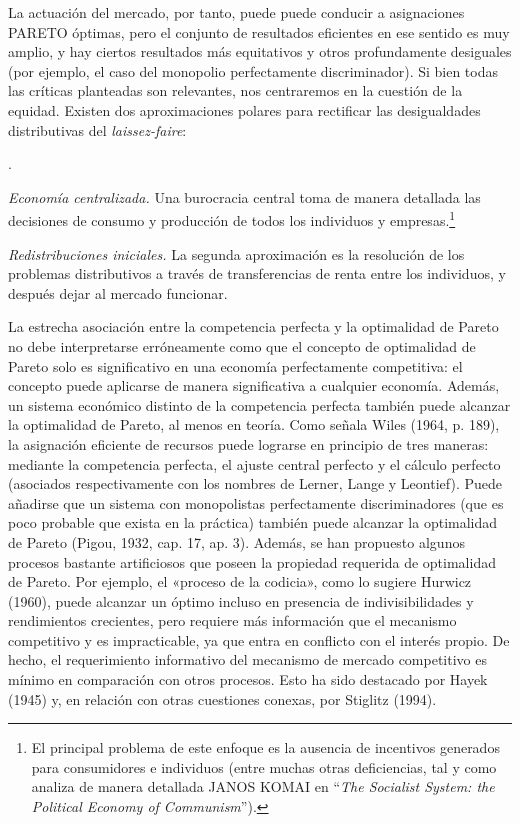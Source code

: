 \documentclass[10pt,a4paper]{article}
\newcounter{numitem}
\newenvironment{lnum}
      {\begin{list}{\arabic{numitem}.}{%
          \usecounter{numitem}%
          \setlength{\leftmargin}{1cm}%
          \setlength{\parskip}{3pt}%
          \setlength{\itemsep}{0pt}%
          \setlength{\parsep}{0pt}%
      }}
      {\end{list}}
\newcommand{\authorfont}[1]{{\fontfamily{EBGaramond-TLF}\selectfont #1}}
\begin{document}
La actuación del mercado, por tanto, puede puede conducir a asignaciones PARETO óptimas, pero el conjunto de resultados eficientes en ese sentido es muy amplio, y hay ciertos resultados más equitativos y otros profundamente desiguales (por ejemplo, el caso del monopolio perfectamente discriminador). Si bien todas las críticas planteadas son relevantes, nos centraremos en la cuestión de la equidad. Existen dos aproximaciones polares para rectificar las desigualdades distributivas del \textit{laissez-faire}: 
\begin{lnum}
    \item \textit{Economía centralizada.} Una burocracia central toma de manera detallada las decisiones de consumo y producción de todos los individuos y empresas.\footnote{%
        El principal problema de este enfoque es la ausencia de incentivos generados para consumidores e individuos (entre muchas otras deficiencias, tal y como analiza de manera detallada \authorfont{JANOS KOMAI} en “\textit{The Socialist System: the Political Economy of Communism}”).
    }
	\item \textit{Redistribuciones iniciales.} La segunda aproximación es la resolución de los problemas distributivos a través de transferencias de renta entre los individuos, y después dejar al mercado funcionar. 
\end{lnum}

La estrecha asociación entre la competencia perfecta y la optimalidad de Pareto no debe interpretarse erróneamente como que el concepto de optimalidad de Pareto solo es significativo en una economía perfectamente competitiva: el concepto puede aplicarse de manera significativa a cualquier economía. Además, un sistema económico distinto de la competencia perfecta también puede alcanzar la optimalidad de Pareto, al menos en teoría. Como señala Wiles (1964, p. 189), la asignación eficiente de recursos puede lograrse en principio de tres maneras: mediante la competencia perfecta, el ajuste central perfecto y el cálculo perfecto (asociados respectivamente con los nombres de Lerner, Lange y Leontief). Puede añadirse que un sistema con monopolistas perfectamente discriminadores (que es poco probable que exista en la práctica) también puede alcanzar la optimalidad de Pareto (Pigou, 1932, cap. 17, ap. 3). Además, se han propuesto algunos procesos bastante artificiosos que poseen la propiedad requerida de optimalidad de Pareto. Por ejemplo, el «proceso de la codicia», como lo sugiere Hurwicz (1960), puede alcanzar un óptimo incluso en presencia de indivisibilidades y rendimientos crecientes, pero requiere más información que el mecanismo competitivo y es impracticable, ya que entra en conflicto con el interés propio. De hecho, el requerimiento informativo del mecanismo de mercado competitivo es mínimo en comparación con otros procesos. Esto ha sido destacado por Hayek (1945) y, en relación con otras cuestiones conexas, por Stiglitz (1994).
\end{document}
